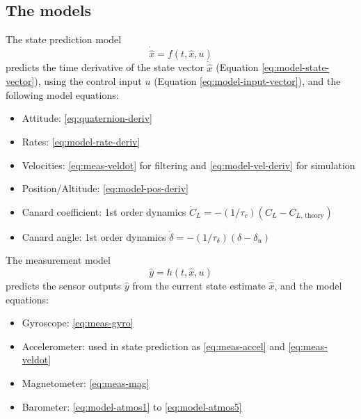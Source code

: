 \subsection{The models}
The state prediction model 
\begin{equation}
    \dot{\hat x} = f(t, \hat x, u)
\end{equation}
predicts the time derivative of the state vector $\dot{\hat x}$ (Equation \ref{eq:model-state-vector}), using the control input $u$ (Equation \ref{eq:model-input-vector}), and the following model equations:
\begin{itemize}
    \item Attitude: \ref{eq:quaternion-deriv}
    \item Rates: \ref{eq:model-rate-deriv}
    \item Velocities: \ref{eq:meas-veldot} for filtering and \ref{eq:model-vel-deriv} for simulation
    \item Position/Altitude: \ref{eq:model-pos-deriv}
    \item Canard coefficient: 1st order dynamics $\dot C_L = -(1/\tau_c) (C_L - C_{L\text{, theory}})$
    \item Canard angle: 1st order dynamics $\dot \delta = -(1/\tau_\delta) (\delta - \delta_u)$
\end{itemize}

The measurement model 
\begin{equation}
    \hat y = h(t, \hat x, u)
\end{equation}
predicts the sensor outputs $\hat y$ from the current state estimate $\hat x$, and the model equations:
\begin{itemize}
    \item Gyroscope: \ref{eq:meas-gyro}
    \item Accelerometer: used in state prediction as \ref{eq:meas-accel} and \ref{eq:meas-veldot}
    \item Magnetometer: \ref{eq:meas-mag}
    \item Barometer: \ref{eq:model-atmos1} to \ref{eq:model-atmos5}
\end{itemize}